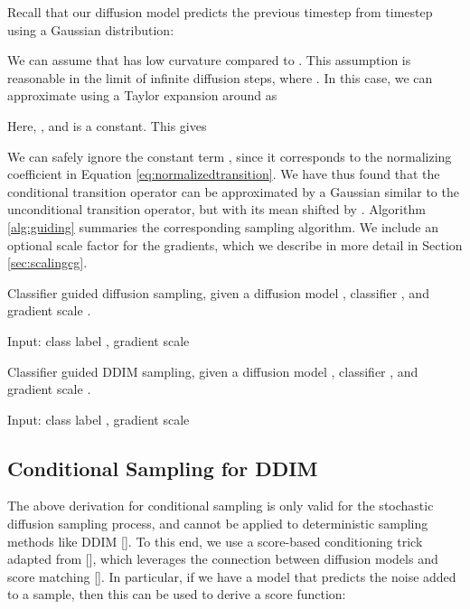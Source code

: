 \documentclass{article}
\newcommand{\shortcite}[1]{[\citenum{#1}]}
\newcommand{\namecite}[1]{\citeauthor{#1} [\citenum{#1}]}
\begin{document}
Recall that our diffusion model predicts the previous timestep  from timestep  using a Gaussian distribution:


We can assume that  has low curvature compared to . This assumption is reasonable in the limit of infinite diffusion steps, where . In this case, we can approximate  using a Taylor expansion around  as 


Here, , and  is a constant. This gives


We can safely ignore the constant term , since it corresponds to the normalizing coefficient  in Equation \ref{eq:normalizedtransition}. We have thus found that the conditional transition operator can be approximated by a Gaussian similar to the unconditional transition operator, but with its mean shifted by . Algorithm \ref{alg:guiding} summaries the corresponding sampling algorithm. We include an optional scale factor  for the gradients, which we describe in more detail in Section \ref{sec:scalingcg}.  

\begin{algorithm}[t]
    \caption{Classifier guided diffusion sampling, given a diffusion model , classifier , and gradient scale .}
    \label{alg:guiding}
    \begin{algorithmic}
        \STATE Input: class label , gradient scale 
        \STATE 
            \STATE 
            \STATE 
        \ENDFOR
        \RETURN 
    \end{algorithmic}
\end{algorithm}

\begin{algorithm}[t]
    \caption{Classifier guided DDIM sampling, given a diffusion model , classifier , and gradient scale .}
    \label{alg:guidingddim}
    \begin{algorithmic}
        \STATE Input: class label , gradient scale 
        \STATE 
            \STATE 
            \STATE 
        \ENDFOR
        \RETURN 
    \end{algorithmic}
\end{algorithm}

\subsection{Conditional Sampling for DDIM}
\label{sec:ddimguide}

The above derivation for conditional sampling is only valid for the stochastic diffusion sampling process, and cannot be applied to deterministic sampling methods like DDIM \shortcite{ddim}. To this end, we use a score-based conditioning trick adapted from \namecite{sde}, which leverages the connection between diffusion models and score matching \shortcite{scorematching}. In particular, if we have a model  that predicts the noise added to a sample, then this can be used to derive a score function:
\end{document}
